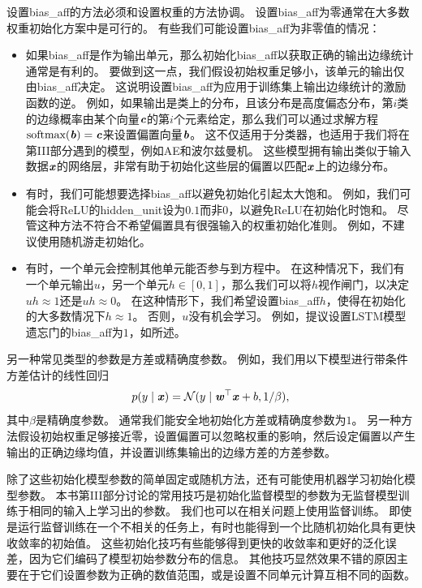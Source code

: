 
设置\gls{bias_aff}的方法必须和设置权重的方法协调。
设置\gls{bias_aff}为零通常在大多数权重初始化方案中是可行的。
有些我们可能设置\gls{bias_aff}为非零值的情况：
\begin{itemize}
\item 如果\gls{bias_aff}是作为输出单元，那么初始化\gls{bias_aff}以获取正确的输出边缘统计通常是有利的。
要做到这一点，我们假设初始权重足够小，该单元的输出仅由\gls{bias_aff}决定。
这说明设置\gls{bias_aff}为应用于训练集上输出边缘统计的激励函数的逆。
例如，如果输出是类上的分布，且该分布是高度偏态分布，第$i$类的边缘概率由某个向量$\boldsymbol{\mathit{c}}$的第$i$个元素给定，那么我们可以通过求解方程$\text{softmax}(\boldsymbol{\mathit{b}})=\boldsymbol{\mathit{c}}$来设置偏置向量$\boldsymbol{\mathit{b}}$。
这不仅适用于分类器，也适用于我们将在第III部分遇到的模型，例如\gls{AE}和波尔兹曼机。
这些模型拥有输出类似于输入数据$\boldsymbol{\mathit{x}}$的网络层，非常有助于初始化这些层的偏置以匹配$\boldsymbol{\mathit{x}}$上的边缘分布。

\item 有时，我们可能想要选择\gls{bias_aff}以避免初始化引起太大饱和。
例如，我们可能会将ReLU的\gls{hidden_unit}设为$0.1$而非$0$，以避免ReLU在初始化时饱和。
尽管这种方法不符合不希望偏置具有很强输入的权重初始化准则。
例如，不建议使用随机游走初始化\citep{Sussillo14}。

\item 有时，一个单元会控制其他单元能否参与到方程中。
在这种情况下，我们有一个单元输出$u$，另一个单元$h\in[0,1]$，那么我们可以将$h$视作闸门，以决定$uh\approx 1$还是$uh\approx 0$。
在这种情形下，我们希望设置\gls{bias_aff}$h$，使得在初始化的大多数情况下$h\approx 1$。
否则，$u$没有机会学习。
例如，\cite{Jozefowicz-et-al-ICML2015}提议设置LSTM模型遗忘门的\gls{bias_aff}为$1$，如所述。
\end{itemize}

另一种常见类型的参数是方差或精确度参数。
例如，我们用以下模型进行带条件方差估计的线性回归
\begin{equation}
    p(y\mid\boldsymbol{\mathit{x}}) = \mathcal{N} (y \mid \boldsymbol{\mathit{w}}^\top \boldsymbol{\mathit{x}} + b, 1/\beta) ,
\end{equation}
其中$\beta$是精确度参数。
通常我们能安全地初始化方差或精确度参数为$1$。
另一种方法假设初始权重足够接近零，设置偏置可以忽略权重的影响，然后设定偏置以产生输出的正确边缘均值，并设置训练集输出的边缘方差的方差参数。


除了这些初始化模型参数的简单固定或随机方法，还有可能使用机器学习初始化模型参数。
本书第III部分讨论的常用技巧是初始化监督模型的参数为无监督模型训练于相同的输入上学习出的参数。
我们也可以在相关问题上使用监督训练。
即使是运行监督训练在一个不相关的任务上，有时也能得到一个比随机初始化具有更快收敛率的初始值。
这些初始化技巧有些能够得到更快的收敛率和更好的泛化误差，因为它们编码了模型初始参数分布的信息。
其他技巧显然效果不错的原因主要在于它们设置参数为正确的数值范围，或是设置不同单元计算互相不同的函数。

